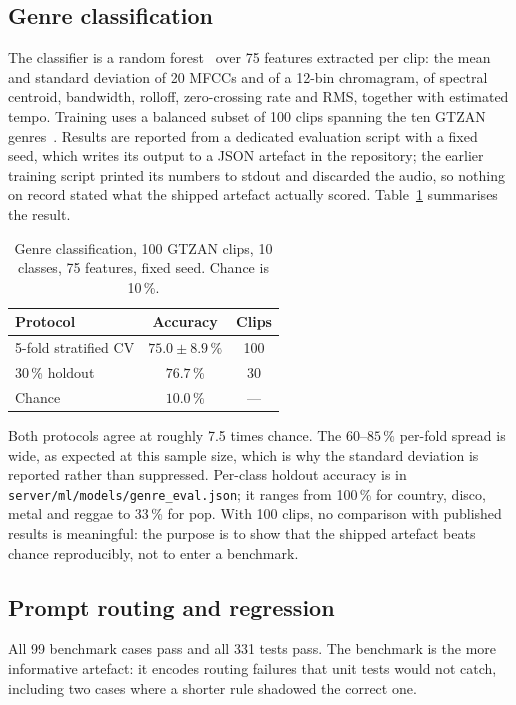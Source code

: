 \documentclass[conference]{IEEEtran}
\begin{document}
\subsection{Genre classification}

The classifier is a random forest~\cite{breiman2001random} over 75 features
extracted per clip: the mean and standard deviation of 20 MFCCs and of a
12-bin chromagram, of spectral centroid, bandwidth, rolloff, zero-crossing rate
and RMS, together with estimated tempo. Training uses a balanced subset of 100
clips spanning the ten GTZAN genres~\cite{tzanetakis2002genre}. Results are
reported from a dedicated evaluation script with a fixed seed, which writes its
output to a JSON artefact in the repository; the earlier training script printed
its numbers to stdout and discarded the audio, so nothing on record stated what
the shipped artefact actually scored. Table~\ref{tab:genre} summarises the
result.

\begin{table}[t]
\centering
\caption{Genre classification, 100 GTZAN clips, 10 classes,
75 features, fixed seed. Chance is 10\,\%.}
\label{tab:genre}
\begin{tabular}{lcc}
\toprule
Protocol & Accuracy & Clips \\
\midrule
5-fold stratified CV & $75.0 \pm 8.9\,\%$ & 100 \\
30\,\% holdout        & $76.7\,\%$          & 30 \\
\midrule
Chance               & $10.0\,\%$          & --- \\
\bottomrule
\end{tabular}
\end{table}

Both protocols agree at roughly 7.5 times chance. The $60$--$85\,\%$ per-fold
spread is wide, as expected at this sample size, which is why the standard
deviation is reported rather than suppressed. Per-class holdout accuracy is in
\texttt{server/ml/models/genre\_eval.json}; it ranges from 100\,\% for
country, disco, metal and reggae to 33\,\% for pop. With 100 clips, no
comparison with published results is meaningful: the purpose is to show that
the shipped artefact beats chance reproducibly, not to enter a benchmark.

\subsection{Prompt routing and regression}

All 99 benchmark cases pass and all 331 tests pass. The benchmark is the more
informative artefact: it encodes routing failures that unit tests would not
catch, including two cases where a shorter rule shadowed the correct one.
\end{document}

